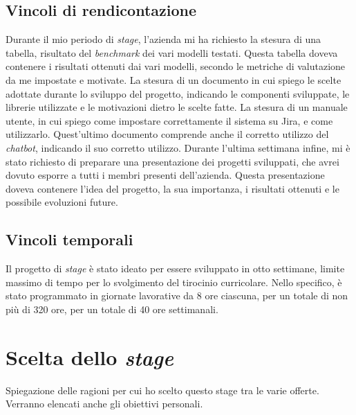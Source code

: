 \subsection{Vincoli di rendicontazione}
Durante il mio periodo di \textit{stage}, l'azienda mi ha richiesto la stesura di una tabella, risultato del \textit{benchmark} dei vari modelli testati. Questa tabella doveva contenere i risultati ottenuti dai vari modelli, secondo le metriche di valutazione da me impostate e motivate.
La stesura di un documento in cui spiego le scelte adottate durante lo sviluppo del progetto, indicando le componenti sviluppate, le librerie utilizzate e le motivazioni dietro le scelte fatte.
La stesura di un manuale utente, in cui spiego come impostare correttamente il sistema su Jira, e come utilizzarlo. Quest'ultimo documento comprende anche il corretto utilizzo del \textit{chatbot}, indicando il suo corretto utilizzo.
Durante l'ultima settimana infine, mi è stato richiesto di preparare una presentazione dei progetti sviluppati, che avrei dovuto esporre a tutti i membri presenti dell'azienda. Questa presentazione doveva contenere l'idea del progetto, la sua importanza, i risultati ottenuti e le possibile evoluzioni future.
\subsection{Vincoli temporali}
Il progetto di \textit{stage} è stato ideato per essere sviluppato in otto settimane, limite massimo di tempo per lo svolgimento del tirocinio curricolare. Nello specifico, è stato programmato in giornate lavorative da 8 ore ciascuna, per un totale di non più di 320 ore, per un totale di 40 ore settimanali.

\section{Scelta dello \textit{stage}}
Spiegazione delle ragioni per cui ho scelto questo stage tra le varie offerte.
Verranno elencati anche gli obiettivi personali.
